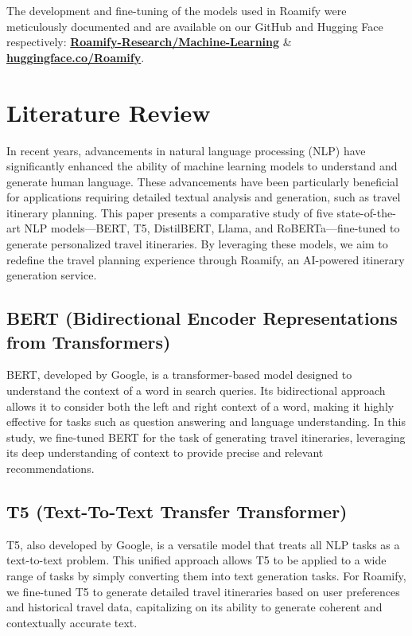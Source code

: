 \documentclass[conference]{IEEEtran}
\begin{document}
    The development and fine-tuning of the models used in Roamify were meticulously documented and are available on our GitHub and Hugging Face respectively: \href{https://github.com/Roamify-Research/Machine-Learning}{\textbf{Roamify-Research/Machine-Learning}} \& \href{https://huggingface.co/Roamify}{\textbf{huggingface.co/Roamify}}.


\section{Literature Review}

    In recent years, advancements in natural language processing (NLP) have significantly enhanced the ability of machine learning models to understand and generate human language. These advancements have been particularly beneficial for applications requiring detailed textual analysis and generation, such as travel itinerary planning. This paper presents a comparative study of five state-of-the-art NLP models—BERT, T5, DistilBERT, Llama, and RoBERTa—fine-tuned to generate personalized travel itineraries. By leveraging these models, we aim to redefine the travel planning experience through Roamify, an AI-powered itinerary generation service.

    \subsection{BERT (Bidirectional Encoder Representations from Transformers)}
        BERT, developed by Google, is a transformer-based model designed to understand the context of a word in search queries. Its bidirectional approach allows it to consider both the left and right context of a word, making it highly effective for tasks such as question answering and language understanding. In this study, we fine-tuned BERT for the task of generating travel itineraries, leveraging its deep understanding of context to provide precise and relevant recommendations.

    \subsection{T5 (Text-To-Text Transfer Transformer)}
        T5, also developed by Google, is a versatile model that treats all NLP tasks as a text-to-text problem. This unified approach allows T5 to be applied to a wide range of tasks by simply converting them into text generation tasks. For Roamify, we fine-tuned T5 to generate detailed travel itineraries based on user preferences and historical travel data, capitalizing on its ability to generate coherent and contextually accurate text.
\end{document}
